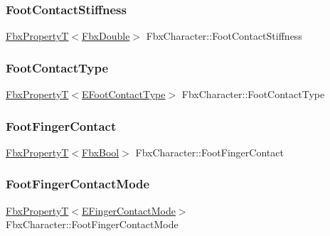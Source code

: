 \subsubsection{\texorpdfstring{Foot\+Contact\+Stiffness}{FootContactStiffness}}
{\footnotesize\ttfamily \hyperlink{class_fbx_property_t}{Fbx\+PropertyT}$<$\hyperlink{fbxtypes_8h_a171e72a1c46fc15c1a6c9c31948c1c5b}{Fbx\+Double}$>$ Fbx\+Character\+::\+Foot\+Contact\+Stiffness}

\mbox{\label{class_fbx_character_a422e7b0fe0418f16fe99d42ccd407cf3}} 
\subsubsection{\texorpdfstring{Foot\+Contact\+Type}{FootContactType}}
{\footnotesize\ttfamily \hyperlink{class_fbx_property_t}{Fbx\+PropertyT}$<$\hyperlink{class_fbx_character_ac8775e4bfaebf2f84b9968a6b7757d8d}{E\+Foot\+Contact\+Type}$>$ Fbx\+Character\+::\+Foot\+Contact\+Type}

\mbox{\label{class_fbx_character_ad07ec037016f94f19f4f8e1168e67399}} 
\subsubsection{\texorpdfstring{Foot\+Finger\+Contact}{FootFingerContact}}
{\footnotesize\ttfamily \hyperlink{class_fbx_property_t}{Fbx\+PropertyT}$<$\hyperlink{fbxtypes_8h_a92e0562b2fe33e76a242f498b362262e}{Fbx\+Bool}$>$ Fbx\+Character\+::\+Foot\+Finger\+Contact}

\mbox{\label{class_fbx_character_aa5a1aff18a78246caf880e1ea425077b}} 
\subsubsection{\texorpdfstring{Foot\+Finger\+Contact\+Mode}{FootFingerContactMode}}
{\footnotesize\ttfamily \hyperlink{class_fbx_property_t}{Fbx\+PropertyT}$<$\hyperlink{class_fbx_character_a97bd5ed3c7b4a63bf46ef111e7dc0f0a}{E\+Finger\+Contact\+Mode}$>$ Fbx\+Character\+::\+Foot\+Finger\+Contact\+Mode}

